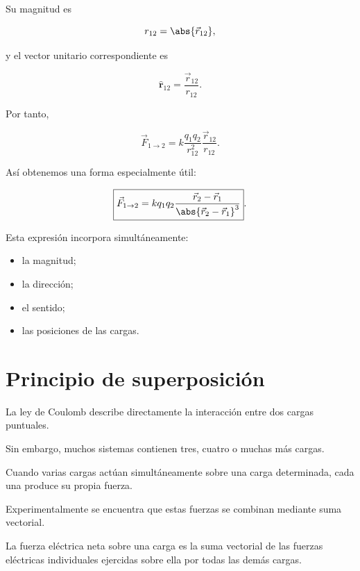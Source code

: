 Su magnitud es

\[
r_{12}
=
\abs{\vec{r}_{12}},
\]

y el vector unitario correspondiente es

\begin{equation}
    \boxed{
    \hat{\mathbf{r}}_{12}
    =
    \frac{\vec{r}_{12}}{r_{12}}
    }.
    \label{eq:unitario_12}
\end{equation}

Por tanto,

\[
\vec{F}_{1\to2}
=
k
\frac{q_1q_2}{r_{12}^{2}}
\frac{\vec{r}_{12}}{r_{12}}.
\]

Así obtenemos una forma especialmente útil:

\begin{equation}
    \boxed{
    \vec{F}_{1\to2}
    =
    kq_1q_2
    \frac{
    \vec{r}_2-\vec{r}_1
    }{
    \abs{\vec{r}_2-\vec{r}_1}^{3}
    }
    }.
    \label{eq:coulomb_posiciones}
\end{equation}

Esta expresión incorpora simultáneamente:

\begin{itemize}
    \item la magnitud;
    \item la dirección;
    \item el sentido;
    \item las posiciones de las cargas.
\end{itemize}



\section{Principio de superposición}

La ley de Coulomb describe directamente la interacción entre dos cargas
puntuales.

Sin embargo, muchos sistemas contienen tres, cuatro o muchas más cargas.

Cuando varias cargas actúan simultáneamente sobre una carga determinada,
cada una produce su propia fuerza.

Experimentalmente se encuentra que estas fuerzas se combinan mediante suma
vectorial.

\begin{principio}

La fuerza eléctrica neta sobre una carga es la suma vectorial de las fuerzas
eléctricas individuales ejercidas sobre ella por todas las demás cargas.

\end{principio}

